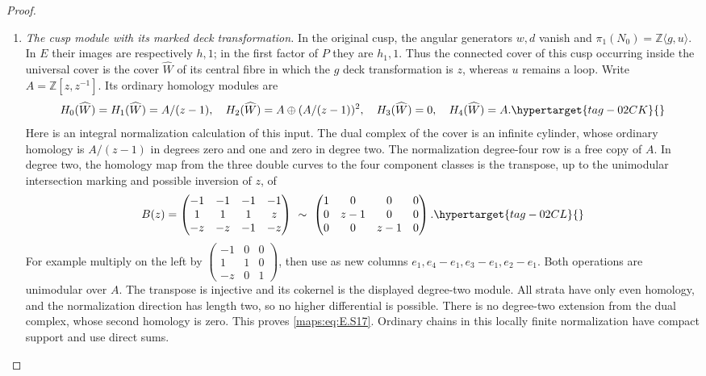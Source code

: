 \documentclass[11pt,a4paper]{article}
\numberwithin{equation}{section}
\theoremstyle{definition}
\begin{document}
\begin{proof}
\begin{enumerate}[label=\arabic*.,leftmargin=*]
\item \emph{The cusp module with its marked deck transformation.}
In the original cusp, the angular generators $w,d$ vanish and
$\pi_1(N_0)=\mathbb Z\langle g,u\rangle$. In $E$ their images
are respectively $h,1$; in the first factor of $P$ they are
$h_1,1$. Thus the connected cover of this cusp occurring inside
the universal cover is the cover $\widehat W$ of its central
fibre in which the $g$ deck transformation is $z$, whereas $u$
remains a loop. Write $A=\mathbb Z[z,z^{-1}]$.
Its ordinary homology modules are
\begin{equation}
 H_0(\widehat W)=H_1(\widehat W)=A/(z-1),\quad
 H_2(\widehat W)=A\oplus(A/(z-1))^2,
 \quad H_3(\widehat W)=0,\quad H_4(\widehat W)=A.
 \hypertarget{tag-02CK}{}\label{maps:eq:E.S17}
\end{equation}
Here is an integral normalization calculation of this input.
The dual complex of the cover is an infinite cylinder, whose
ordinary homology is $A/(z-1)$ in degrees zero and one and zero
in degree two. The normalization degree-four row is a free
copy of $A$. In degree two, the homology map from the three
double curves to the four component classes is the transpose,
up to the unimodular intersection marking and possible inversion
of $z$, of
\begin{equation}
 B(z)=\begin{pmatrix}
 -1&-1&-1&-1\\ 1&1&1&z\\-z&-z&-1&-z
 \end{pmatrix}
 \ \sim\
 \begin{pmatrix}1&0&0&0\\0&z-1&0&0\\0&0&z-1&0\end{pmatrix}.
 \hypertarget{tag-02CL}{}\label{maps:eq:E.S18}
\end{equation}
For example multiply on the left by
$\left(\begin{smallmatrix}-1&0&0\\1&1&0\\-z&0&1\end{smallmatrix}\right)$,
then use as new columns $e_1,e_4-e_1,e_3-e_1,e_2-e_1$.
Both operations are unimodular over $A$. The transpose is
injective and its cokernel is the displayed degree-two module.
All strata have only even homology, and the normalization
direction has length two, so no higher differential is possible.
There is no degree-two extension from the dual complex, whose
second homology is zero. This proves \eqref{maps:eq:E.S17}. Ordinary chains
in this locally finite normalization have compact support and
use direct sums.


\end{enumerate}
\end{proof}
\end{document}
